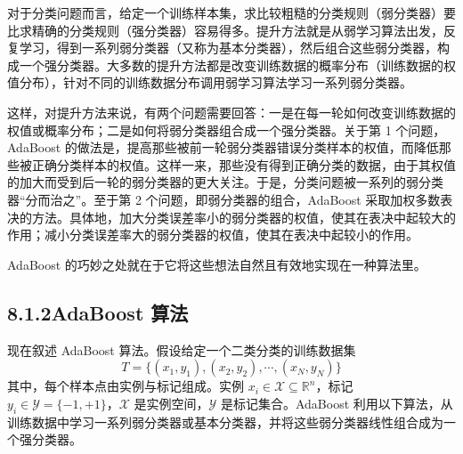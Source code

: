 \documentclass[UTF8, 12pt, fontset=fandol, oneside]{ctexart}
\begin{document}
对于分类问题而言，给定一个训练样本集，求比较粗糙的分类规则（弱分类器）要比求精确的分类规则（强分类器）容易得多。提升方法就是从弱学习算法出发，反复学习，得到一系列弱分类器（又称为基本分类器），然后组合这些弱分类器，构成一个强分类器。大多数的提升方法都是改变训练数据的概率分布（训练数据的权值分布），针对不同的训练数据分布调用弱学习算法学习一系列弱分类器。

这样，对提升方法来说，有两个问题需要回答：一是在每一轮如何改变训练数据的权值或概率分布；二是如何将弱分类器组合成一个强分类器。关于第 1 个问题，AdaBoost 的做法是，提高那些被前一轮弱分类器错误分类样本的权值，而降低那些被正确分类样本的权值。这样一来，那些没有得到正确分类的数据，由于其权值的加大而受到后一轮的弱分类器的更大关注。于是，分类问题被一系列的弱分类器“分而治之”。至于第 2 个问题，即弱分类器的组合，AdaBoost 采取加权多数表决的方法。具体地，加大分类误差率小的弱分类器的权值，使其在表决中起较大的作用；减小分类误差率大的弱分类器的权值，使其在表决中起较小的作用。

AdaBoost 的巧妙之处就在于它将这些想法自然且有效地实现在一种算法里。

\subsection*{8.1.2\quad AdaBoost 算法}

现在叙述 AdaBoost 算法。假设给定一个二类分类的训练数据集
\[
T=\{(x_1,y_1),(x_2,y_2),\cdots,(x_N,y_N)\}
\]
其中，每个样本点由实例与标记组成。实例 $x_i\in\mathcal{X}\subseteq\mathbb{R}^n$，标记 $y_i\in\mathcal{Y}=\{-1,+1\}$，$\mathcal{X}$ 是实例空间，$\mathcal{Y}$ 是标记集合。AdaBoost 利用以下算法，从训练数据中学习一系列弱分类器或基本分类器，并将这些弱分类器线性组合成为一个强分类器。
\end{document}

